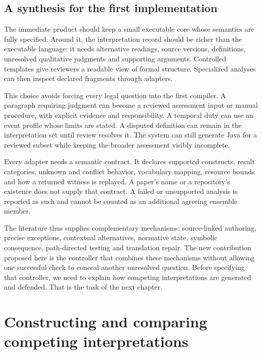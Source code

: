 \documentclass[12pt,a4paper,oneside,openany]{book}
\begin{document}
\section{A synthesis for the first implementation}
\label{merge:M04:14}

\label{sec:languages-synthesis}
The immediate product should keep a small executable core whose semantics are
fully specified. Around it, the interpretation record should be richer than
the executable language: it needs alternative readings, source versions,
definitions, unresolved qualitative judgments and supporting arguments.
Controlled templates give reviewers a readable view of formal structure.
Specialized analyses can then inspect declared fragments through adapters.

This choice avoids forcing every legal question into the first compiler.
A paragraph requiring judgment can become a reviewed assessment input or
manual procedure, with explicit evidence and responsibility. A temporal duty
can use an event profile whose limits are stated. A disputed definition can
remain in the interpretation set until review resolves it. The system can
still generate Java for a reviewed subset while keeping the broader
assessment visibly incomplete.

Every adapter needs a semantic contract. It declares supported constructs,
result categories, unknown and conflict behavior, vocabulary mapping,
resource bounds and how a returned witness is replayed. A paper's name or
a repository's existence does not supply that contract. A failed or
unsupported analysis is reported as such and cannot be counted as an
additional agreeing ensemble member.

The literature thus supplies complementary mechanisms: source-linked
authoring, precise exceptions, contextual alternatives, normative state,
symbolic consequence, path-directed testing and translation repair. The
new contribution proposed here is the controller that combines these
mechanisms without allowing one successful check to conceal another
unresolved question. Before specifying that controller, we need to explain
how competing interpretations are generated and defended. That is the task
of the next chapter.


\chapter{Constructing and comparing competing interpretations}
\label{ch:search}
\end{document}
